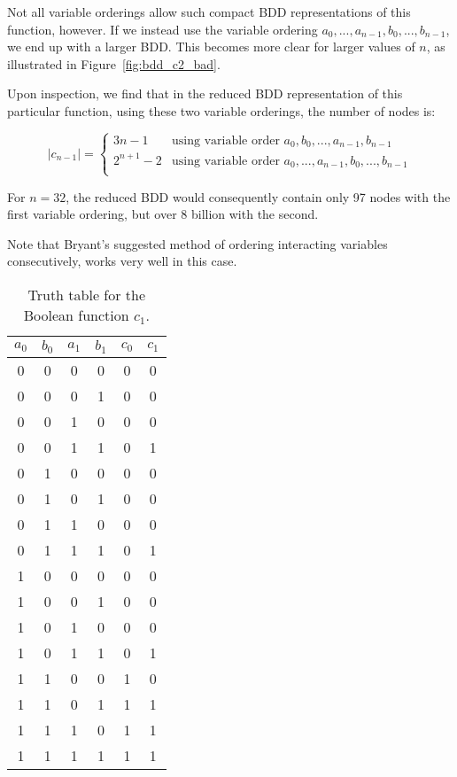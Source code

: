 \documentclass[a4paper,11pt]{kth-mag}
\begin{document}
Not all variable orderings allow such compact BDD representations of this function, however.
If we instead use the variable ordering $a_0,...,a_{n-1},b_0,...,b_{n-1}$, we end up with a larger BDD.
This becomes more clear for larger values of $n$, as illustrated in Figure~\ref{fig:bdd_c2_bad}.

Upon inspection, we find that in the reduced BDD representation of this particular function, using these two variable orderings, the number of nodes is:

$$
  |c_{n-1}| = \left\{
  \begin{array}{ll}
    3n-1      & \textrm{using variable order $a_0,b_0,...,a_{n-1},b_{n-1}$} \\
    2^{n+1}-2 & \textrm{using variable order $a_0,...,a_{n-1},b_0,...,b_{n-1}$} \\
  \end{array}\right.
$$

For $n = 32$, the reduced BDD would consequently contain only 97 nodes with the first variable ordering, but over 8 billion with the second.

Note that Bryant's suggested method of ordering interacting variables consecutively, works very well in this case.

\begin{table}[p]
\centering
\begin{tabular}{cccc|cc}
$a_0$ & $b_0$ & $a_1$ & $b_1$ & $c_0$ & $c_1$ \\
\hline
0     & 0     & 0     & 0     & 0     & 0 \\
0     & 0     & 0     & 1     & 0     & 0 \\
0     & 0     & 1     & 0     & 0     & 0 \\
0     & 0     & 1     & 1     & 0     & 1 \\
0     & 1     & 0     & 0     & 0     & 0 \\
0     & 1     & 0     & 1     & 0     & 0 \\
0     & 1     & 1     & 0     & 0     & 0 \\
0     & 1     & 1     & 1     & 0     & 1 \\
1     & 0     & 0     & 0     & 0     & 0 \\
1     & 0     & 0     & 1     & 0     & 0 \\
1     & 0     & 1     & 0     & 0     & 0 \\
1     & 0     & 1     & 1     & 0     & 1 \\
1     & 1     & 0     & 0     & 1     & 0 \\
1     & 1     & 0     & 1     & 1     & 1 \\
1     & 1     & 1     & 0     & 1     & 1 \\
1     & 1     & 1     & 1     & 1     & 1 \\
\end{tabular}
\caption{Truth table for the Boolean function $c_1$.}
\label{tab:tt_c1}
\end{table}
\end{document}

